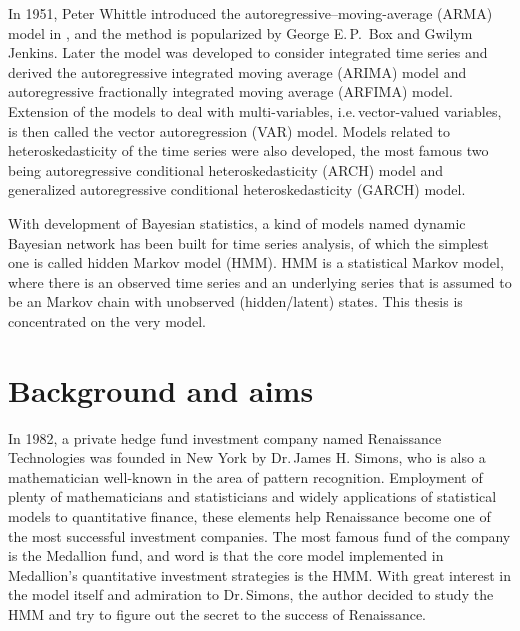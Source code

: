 In 1951, Peter Whittle introduced the autoregressive–moving-average (ARMA) model in \cite{Whittle:1951hy},
and the method is popularized by George E.\,P.~Box and Gwilym Jenkins.
Later the model was developed to consider integrated time series and derived 
the autoregressive integrated moving average (ARIMA) model and 
autoregressive fractionally integrated moving average (ARFIMA) model.
Extension of the models to deal with multi-variables, 
i.e.\,vector-valued variables,
is then called the vector autoregression (VAR) model.
Models related to heteroskedasticity of the time series were also developed,
the most famous two being autoregressive conditional heteroskedasticity (ARCH) model
and generalized autoregressive conditional heteroskedasticity (GARCH) model.

With development of Bayesian statistics,
a kind of models named dynamic Bayesian network has been built for time series analysis,
of which the simplest one is called hidden Markov model (HMM).
HMM is a statistical Markov model,
where there is an observed time series and 
an underlying series that is assumed to be an Markov chain with unobserved (hidden/latent) states.
This thesis is concentrated on the very model.


\section{Background and aims}
\label{sec:introduction:background}
In 1982, a private hedge fund investment company named Renaissance Technologies 
was founded in New York by Dr.\,James H. Simons,
who is also a mathematician well-known in the area of pattern recognition.
Employment of plenty of mathematicians and statisticians and
widely applications of statistical models to quantitative finance,
these elements help Renaissance become one of the most successful investment companies.
The most famous fund of the company is the Medallion fund,
and word is that the core model implemented in Medallion's quantitative investment strategies is the HMM.
With great interest in the model itself and admiration to Dr.\,Simons,
the author decided to study the HMM and try to figure out the secret to the success of Renaissance.

